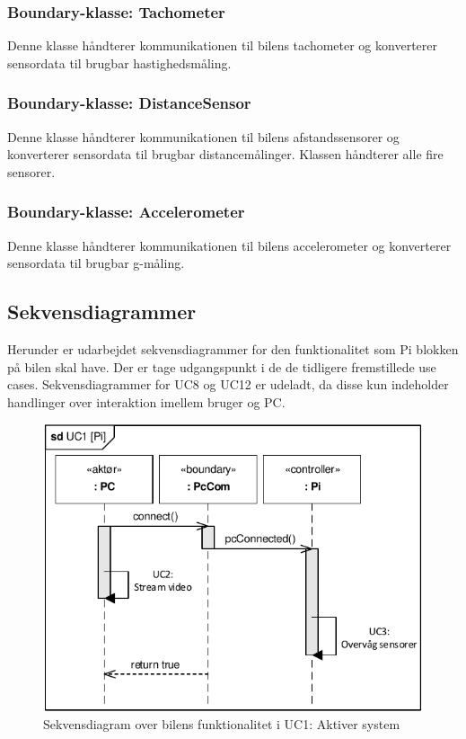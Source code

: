 \subsubsection{Boundary-klasse: Tachometer}
Denne klasse håndterer kommunikationen til bilens tachometer og konverterer sensordata til brugbar hastighedsmåling.

\subsubsection{Boundary-klasse: DistanceSensor}
Denne klasse håndterer kommunikationen til bilens afstandssensorer og konverterer sensordata til brugbar distancemålinger. Klassen håndterer alle fire sensorer.

\subsubsection{Boundary-klasse: Accelerometer}
Denne klasse håndterer kommunikationen til bilens accelerometer og konverterer sensordata til brugbar g-måling.

\clearpage

\subsection{Sekvensdiagrammer}
Herunder er udarbejdet sekvensdiagrammer for den funktionalitet som Pi blokken på bilen skal have. Der er tage udgangspunkt i de de tidligere fremstillede use cases. Sekvensdiagrammer for UC8 og UC12 er udeladt, da disse kun indeholder handlinger over interaktion imellem bruger og PC.

\begin{figure}[h]
\centering
\includegraphics[]{../fig/diagrammer/bil/sd_uc1.pdf}
\caption{Sekvensdiagram over  bilens funktionalitet i UC1: Aktiver system}
\label{fig:sd_uc1_bil}
\end{figure}

